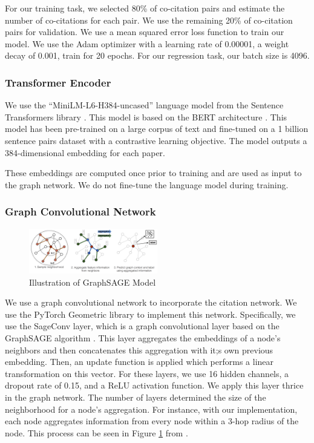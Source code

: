 \documentclass[10pt,twocolumn,letterpaper]{article}
\begin{document}
For our training task, we selected 80\% of co-citation pairs and estimate the number of co-citations for each pair. We use the remaining 20\% of co-citation pairs for validation. 
We use a mean squared error loss function to train our model.
We use the Adam optimizer with a learning rate of 0.00001, a weight decay of 0.001, train for 20 epochs. For our regression task, our batch size is 4096.

\subsubsection{Transformer Encoder}

We use the ``MiniLM-L6-H384-uncased'' language model from the Sentence Transformers library \cite{reimers2019sentence}. This model is based on the BERT architecture \cite{devlin2018bert}. This model has been pre-trained on a large corpus of text and fine-tuned on a 1 billion sentence pairs dataset with a contrastive learning objective. The model outputs a 384-dimensional embedding for each paper.

These embeddings are computed once prior to training and are used as input to the graph network. We do not fine-tune the language model during training.

\subsubsection{Graph Convolutional Network}
\begin{figure}
   \centering
   \includegraphics[width=0.5\textwidth]{figures/graphsage.png}
   \caption{Illustration of GraphSAGE Model}
   \label{fig:graph}
\end{figure}

We use a graph convolutional network to incorporate the citation network. We use the PyTorch Geometric library \cite{fey2019fast} to implement this network. Specifically, we use the SageConv layer, which is a graph convolutional layer based on the GraphSAGE algorithm \cite{hamilton2017inductive}. This layer aggregates the embeddings of a node's neighbors and then concatenates this aggregation with it;s own previous embedding. Then, an update function is applied which performs a linear transformation on this vector. For these layers, we use 16 hidden channels, a dropout rate of 0.15, and a ReLU activation function. We apply this layer thrice in the graph network. The number of layers determined the size of the neighborhood for a node's aggregation. For instance, with our implementation, each node aggregates information from every node within a 3-hop radius of the node. This process can be seen in Figure \ref{fig:graph} from \cite{hamilton2017inductive}. 
\end{document}

